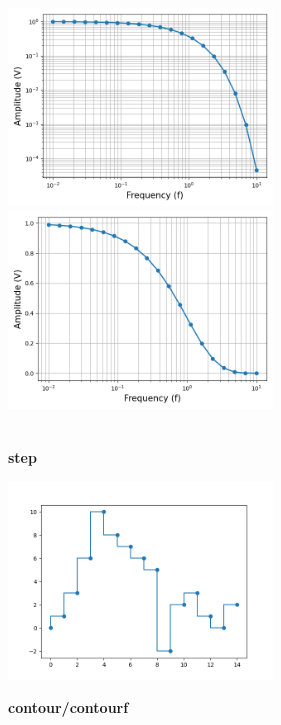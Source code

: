 \begin{minipage}[h]{8cm}
	\includegraphics[width=7cm,align=t]{pics/Matplotlib/Loglog.png}
	\includegraphics[width=7cm,align=t]{pics/Matplotlib/Semilogx.png}
\end{minipage}
\\[0.1cm]
\textbf{step}
\\
\begin{minipage}[h]{10cm}
	
\end{minipage}
\begin{minipage}[h]{8cm}
	\includegraphics[width=7cm,align=t]{pics/Matplotlib/Step.png}
\end{minipage}
\newpage
\textbf{contour/contourf}
\\
\begin{minipage}[h]{10cm}
	
\end{minipage}
